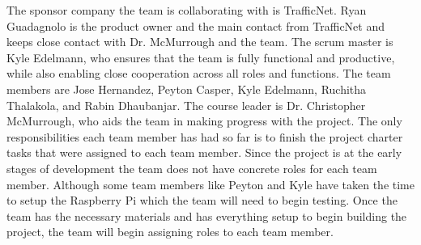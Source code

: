 The sponsor company the team is collaborating with is TrafficNet. Ryan Guadagnolo is the product owner and the main contact from TrafficNet and keeps close contact with Dr. McMurrough and the team. The scrum master is Kyle Edelmann, who ensures that the team is fully functional and productive, while also enabling close cooperation across all roles and functions. The team members are Jose Hernandez, Peyton Casper, Kyle Edelmann, Ruchitha Thalakola, and Rabin Dhaubanjar. The course leader is 
Dr. Christopher McMurrough, who aids the team in making progress with the project. The only responsibilities each team member has had so far is to finish the project charter tasks that were assigned to each team member. Since the project is at the early stages of development the team does not have concrete roles for each team member. Although some team members like Peyton and Kyle have taken the time to setup the Raspberry Pi which the team will need to begin testing. Once the team has the necessary materials and has everything setup to begin building the project, the team will begin assigning roles to each team member.
